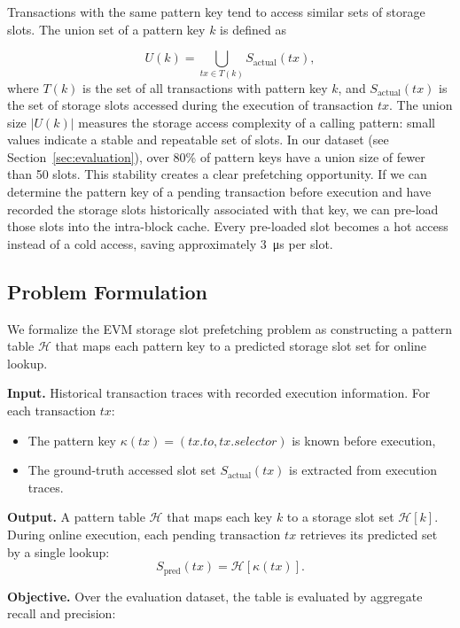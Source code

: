 \documentclass[conference]{IEEEtran}
\begin{document}
Transactions with the same pattern key tend to access similar sets of storage slots.
The union set of a pattern key $k$ is defined as

\begin{equation}
U(k) = \bigcup_{tx \in T(k)} S_{\text{actual}}(tx),
\label{eq:union-size}
\end{equation}
where $T(k)$ is the set of all transactions with pattern key $k$, and
$S_{\text{actual}}(tx)$ is the set of storage slots accessed during the execution of
transaction $tx$. The union size $|U(k)|$ measures the storage access complexity of a
calling pattern: small values indicate a stable and repeatable set of slots. In our
dataset (see Section~\ref{sec:evaluation}), over 80\% of pattern keys have a union size
of fewer than 50 slots. This stability creates a clear prefetching opportunity. If we can
determine the pattern key of a pending transaction before execution and have recorded the
storage slots historically associated with that key, we can pre-load those slots into the
intra-block cache. Every pre-loaded slot becomes a hot access instead of a cold access,
saving approximately \qty{3}{\micro\second} per slot.

\subsection{Problem Formulation}
\label{sec:problem-formulation}

We formalize the EVM storage slot prefetching problem as constructing a pattern table $\mathcal{H}$ that maps each pattern key to a predicted storage slot set for online lookup.

\textbf{Input.} Historical transaction traces with recorded execution information. For each transaction $tx$:
\begin{itemize}
    \item The pattern key $\kappa(tx) = (tx.to, tx.selector)$ is known before execution,
    \item The ground-truth accessed slot set $S_{\text{actual}}(tx)$ is extracted from execution traces.
\end{itemize}

\textbf{Output.} A pattern table $\mathcal{H}$ that maps each key $k$ to a storage slot set $\mathcal{H}[k]$. During online execution, each pending transaction $tx$ retrieves its predicted set by a single lookup:
\[
S_{\text{pred}}(tx) = \mathcal{H}[\kappa(tx)].
\]

\textbf{Objective.} Over the evaluation dataset, the table is evaluated by aggregate recall and precision:
\end{document}
